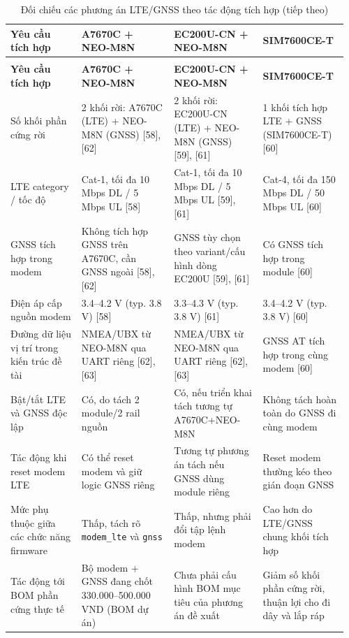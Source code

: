 \documentclass[a4paper]{extarticle}
\newcommand{\thesissettableid}[2]{%
  \renewcommand{\thetable}{#1}%
  \renewcommand{\theHtable}{#2}%
}
\begin{document}
{\thesissettableid{3.3}{tab-ch3-oi-chieu-cac-phuong-an-lte-gnss-theo-tac-ong-tich-hop}
\def\LTcaptype{table}
\begin{longtable}{|L{0.202\linewidth}|L{0.260\linewidth}|L{0.252\linewidth}|L{0.241\linewidth}|}
\caption{Đối chiếu các phương án LTE/GNSS theo tác động tích hợp}\label{tab:ch3-oi-chieu-cac-phuong-an-lte-gnss-theo-tac-ong-tich-hop}\\
\hline \textbf{Yêu cầu tích hợp} & \textbf{A7670C + NEO-M8N} & \textbf{EC200U-CN + NEO-M8N} & \textbf{SIM7600CE-T} \\
\hline
\endfirsthead
\caption[]{Đối chiếu các phương án LTE/GNSS theo tác động tích hợp (tiếp theo)}\\
\hline \textbf{Yêu cầu tích hợp} & \textbf{A7670C + NEO-M8N} & \textbf{EC200U-CN + NEO-M8N} & \textbf{SIM7600CE-T} \\
\hline
\endhead
\hline
\endfoot
\endlastfoot
Số khối phần cứng rời & 2 khối rời: A7670C (LTE) + NEO-M8N (GNSS)
{[}58{]}, {[}62{]} & 2 khối rời: EC200U-CN (LTE) + NEO-M8N (GNSS)
{[}59{]}, {[}61{]} & 1 khối tích hợp LTE + GNSS (SIM7600CE-T) {[}60{]} \\\hline
LTE category / tốc độ & Cat-1, tối đa 10 Mbps DL / 5 Mbps UL {[}58{]} &
Cat-1, tối đa 10 Mbps DL / 5 Mbps UL {[}59{]}, {[}61{]} & Cat-4, tối đa
150 Mbps DL / 50 Mbps UL {[}60{]} \\\hline
GNSS tích hợp trong modem & Không tích hợp GNSS trên A7670C, cần GNSS
ngoài {[}58{]}, {[}62{]} & GNSS tùy chọn theo variant/cấu hình dòng
EC200U {[}59{]}, {[}61{]} & Có GNSS tích hợp trong module {[}60{]} \\\hline
Điện áp cấp nguồn modem & 3.4--4.2 V (typ. 3.8 V) {[}58{]} & 3.3--4.3 V
(typ. 3.8 V) {[}61{]} & 3.4--4.2 V (typ. 3.8 V) {[}60{]} \\\hline
Đường dữ liệu vị trí trong kiến trúc đề tài & NMEA/UBX từ NEO-M8N qua
UART riêng {[}62{]}, {[}63{]} & NMEA/UBX từ NEO-M8N qua UART riêng
{[}62{]}, {[}63{]} & GNSS AT tích hợp trong cùng modem {[}60{]} \\\hline
Bật/tắt LTE và GNSS độc lập & Có, do tách 2 module/2 rail nguồn & Có,
nếu triển khai tách tương tự A7670C+NEO-M8N & Không tách hoàn toàn do
GNSS đi cùng modem \\\hline
Tác động khi reset modem LTE & Có thể reset modem và giữ logic GNSS
riêng & Tương tự phương án tách nếu GNSS dùng module riêng & Reset modem
thường kéo theo gián đoạn GNSS \\\hline
Mức phụ thuộc giữa các chức năng firmware & Thấp, tách rõ
\texttt{modem\_lte} và \texttt{gnss} & Thấp, nhưng phải đổi tập lệnh
modem & Cao hơn do LTE/GNSS chung khối tích hợp \\\hline
Tác động tới BOM phần cứng thực tế & Bộ modem + GNSS đang chốt
330.000--500.000 VND (BOM dự án) & Chưa phải cấu hình BOM mục tiêu của phương án đề xuất
& Giảm số khối phần cứng rời, thuận lợi cho đi dây và lắp ráp \\\hline
\end{longtable}
}
\end{document}
